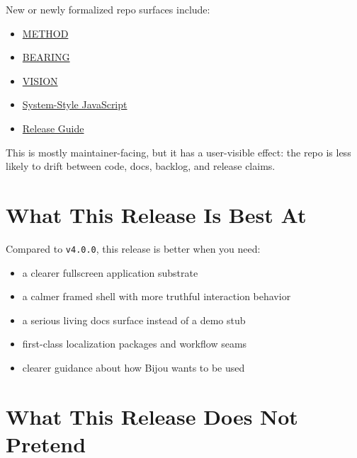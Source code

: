 New or newly formalized repo surfaces include:

\begin{itemize}
\tightlist
\item
  \href{https://github.com/flyingrobots/bijou/blob/5b10cb89165b76673ffc60da59d7de5a531e55e9/docs/METHOD.md}{METHOD}
\item
  \href{https://github.com/flyingrobots/bijou/blob/5b10cb89165b76673ffc60da59d7de5a531e55e9/docs/BEARING.md}{BEARING}
\item
  \href{https://github.com/flyingrobots/bijou/blob/cbd70612140e7a450d764b3c7be1c6af878b99bc/docs/VISION.md}{VISION}
\item
  \href{https://github.com/flyingrobots/bijou/blob/cbd70612140e7a450d764b3c7be1c6af878b99bc/docs/system-style-javascript.md}{System-Style JavaScript}
\item
  \href{https://github.com/flyingrobots/bijou/blob/cbd70612140e7a450d764b3c7be1c6af878b99bc/docs/release.md}{Release Guide}
\end{itemize}

This is mostly maintainer-facing, but it has a user-visible effect: the repo is less likely to drift between code, docs, backlog, and release claims.

\section{What This Release Is Best At}\label{record-275-what-this-release-is-best-at}

Compared to \texttt{v\allowbreak{}4\allowbreak{}.\allowbreak{}0\allowbreak{}.\allowbreak{}0}, this release is better when you need:

\begin{itemize}
\tightlist
\item
  a clearer fullscreen application substrate
\item
  a calmer framed shell with more truthful interaction behavior
\item
  a serious living docs surface instead of a demo stub
\item
  first-class localization packages and workflow seams
\item
  clearer guidance about how Bijou wants to be used
\end{itemize}

\section{What This Release Does Not Pretend}\label{record-275-what-this-release-does-not-pretend}

